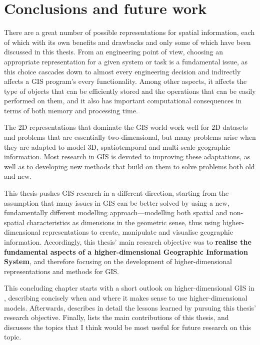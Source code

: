 
\chapter{Conclusions and future work}
\label{ch:conclusions}


There are a great number of possible representations for spatial information, each of which with its own benefits and drawbacks and only some of which have been discussed in this thesis.
From an engineering point of view, choosing an appropriate representation for a given system or task is a fundamental issue, as this choice cascades down to almost every engineering decision and indirectly affects a GIS program's every functionality.
Among other aspects, it affects the type of objects that can be efficiently stored and the operations that can be easily performed on them, and it also has important computational consequences in terms of both memory and processing time.

The 2D representations that dominate the GIS world work well for 2D datasets and problems that are essentially two-dimensional, but many problems arise when they are adapted to model 3D, spatiotemporal and multi-scale geographic information.
Most research in GIS is devoted to improving these adaptations, as well as to developing new methods that build on them to solve problems both old and new.

This thesis pushes GIS research in a different direction, starting from the assumption that many issues in GIS can be better solved by using a new, fundamentally different modelling approach---modelling both spatial and non-spatial characteristics as dimensions in the geometric sense, thus using higher-dimensional representations to create, manipulate and visualise geographic information.
Accordingly, this thesis' main research objective was to \textbf{realise the fundamental aspects of a higher-dimensional Geographic Information System}, and therefore focusing on the development of higher-dimensional representations and methods for GIS.\@

This concluding chapter starts with a short outlook on higher-dimensional GIS in , describing concisely 
when and where it makes sense to use higher-dimensional models.
Afterwards,  describes in detail the lessons learned by pursuing this thesis' research objective.
Finally,  lists the main contributions of this thesis, and  discusses the topics that I think would be most useful for future research on this topic.

